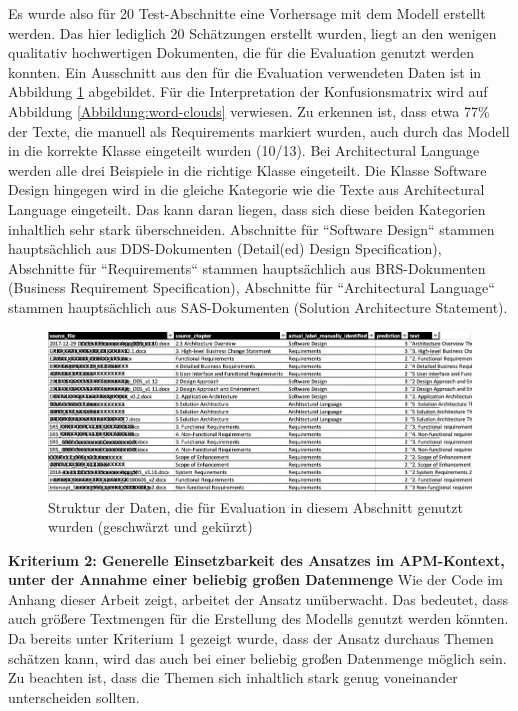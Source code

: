 Es wurde also für 20 Test-Abschnitte eine Vorhersage mit dem Modell erstellt werden. Das hier lediglich 20 Schätzungen erstellt wurden, liegt an den wenigen qualitativ hochwertigen Dokumenten, die für die Evaluation genutzt werden konnten. Ein Ausschnitt aus den für die Evaluation verwendeten Daten ist in Abbildung \ref{Abbildung:test-setup} abgebildet. Für die Interpretation der Konfusionsmatrix wird auf Abbildung \ref{Abbildung:word-clouds} verwiesen. Zu erkennen ist, dass etwa 77\% der Texte, die manuell als Requirements markiert wurden, auch durch das Modell in die korrekte Klasse eingeteilt wurden (10/13). Bei Architectural Language werden alle drei Beispiele in die richtige Klasse eingeteilt. Die Klasse Software Design hingegen wird in die gleiche Kategorie wie die Texte aus Architectural Language eingeteilt. Das kann daran liegen, dass sich diese beiden Kategorien inhaltlich sehr stark überschneiden. Abschnitte für ``Software Design`` stammen hauptsächlich aus DDS-Dokumenten (Detail(ed) Design Specification), Abschnitte für ``Requirements`` stammen hauptsächlich aus BRS-Dokumenten (Business Requirement Specification), Abschnitte für ``Architectural Language`` stammen hauptsächlich aus SAS-Dokumenten (Solution Architecture Statement). 

\begin{figure}[h]
\centering
\includegraphics[scale=0.95]{content/pics/Picture_20.png}
\caption{Struktur der Daten, die für Evaluation in diesem Abschnitt genutzt wurden (geschwärzt und gekürzt)}
\label{Abbildung:test-setup}
\end{figure}

{\bf Kriterium 2: Generelle Einsetzbarkeit des Ansatzes im APM-Kontext, unter der Annahme einer beliebig großen Datenmenge}
Wie der Code im Anhang dieser Arbeit zeigt, arbeitet der Ansatz unüberwacht. Das bedeutet, dass auch größere Textmengen für die Erstellung des Modells genutzt werden könnten. Da bereits unter Kriterium 1 gezeigt wurde, dass der Ansatz durchaus Themen schätzen kann, wird das auch bei einer beliebig großen Datenmenge möglich sein. Zu beachten ist, dass die Themen sich inhaltlich stark genug voneinander unterscheiden sollten.

